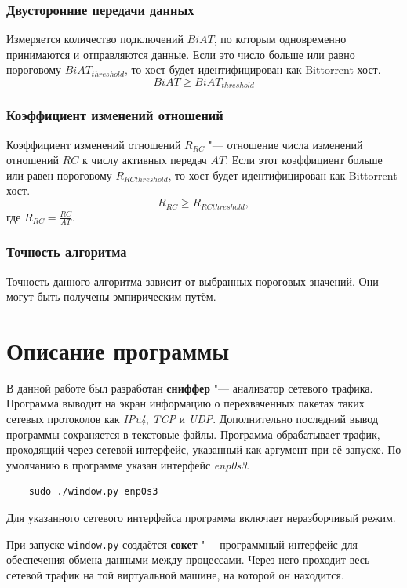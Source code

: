 \documentclass[bachelor, och, coursework]{SCWorks}
\begin{document}
\subsubsection{Двусторонние передачи данных}
Измеряется количество подключений $BiAT$, по которым одновременно принимаются и отправляются данные. 
Если это число больше или равно пороговому $BiAT_{threshold}$, то хост будет идентифицирован как Bittorrent-хост.
\[ BiAT \geq BiAT_{threshold} \]

\subsubsection{Коэффициент изменений отношений}
Коэффициент изменений отношений $R_{RC}$ "--- отношение числа изменений отношений $RC$ к числу активных передач $AT$.
Если этот коэффициент больше или равен пороговому $R_{RCthreshold}$, то хост будет идентифицирован как Bittorrent-хост.
\[ R_{RC} \geq R_{RCthreshold}, \]
где $R_{RC} = \frac{RC}{AT}$.

\subsubsection{Точность алгоритма}
Точность данного алгоритма зависит от выбранных пороговых значений. Они могут быть получены эмпирическим путём.

\section{Описание программы}
В данной работе был разработан \textbf{сниффер} "--- анализатор сетевого трафика. 
Программа выводит на экран информацию о перехваченных пакетах таких сетевых протоколов как \textit{IPv4}, \textit{TCP} и \textit{UDP}. 
Дополнительно последний вывод программы сохраняется в текстовые файлы. Программа обрабатывает трафик, проходящий через сетевой интерфейс, указанный как аргумент при её запуске. По умолчанию в программе указан интерфейс \textit{enp0s3}.

\begin{verbatim}
    sudo ./window.py enp0s3
\end{verbatim}

Для указанного сетевого интерфейса программа включает неразборчивый режим.

При запуске \texttt{window.py} создаётся \textbf{сокет} "--- программный интерфейс для обеспечения обмена данными между процессами. Через него проходит весь сетевой трафик на той виртуальной машине, на которой он находится. 
\end{document}
